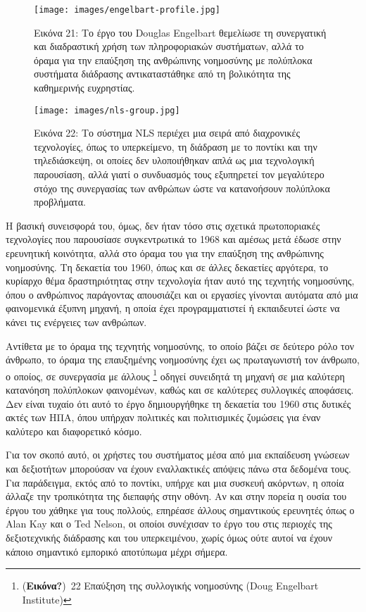 \documentclass[
]{article}
\begin{document}
\leavevmode{}%
\begin{figure}
\hypertarget{fig:engelbart-profile}{%
\centering
\texttt{[image: images/engelbart-profile.jpg]}
\caption{Εικόνα 21: Το έργο του Douglas Engelbart θεμελίωσε τη
συνεργατική και διαδραστική χρήση των πληροφοριακών συστήματων, αλλά το
όραμα για την επαύξηση της ανθρώπινης νοημοσύνης με πολύπλοκα συστήματα
διάδρασης αντικαταστάθηκε από τη βολικότητα της καθημερινής
ευχρηστίας.}\label{fig:engelbart-profile}
}
\end{figure}

\leavevmode{}%
\begin{figure}
\hypertarget{fig:nls-group}{%
\centering
\texttt{[image: images/nls-group.jpg]}
\caption{Εικόνα 22: Το σύστημα NLS περιέχει μια σειρά από διαχρονικές
τεχνολογίες, όπως το υπερκείμενο, τη διάδραση με το ποντίκι και την
τηλεδιάσκεψη, οι οποίες δεν υλοποιήθηκαν απλά ως μια τεχνολογική
παρουσίαση, αλλά γιατί ο συνδυασμός τους εξυπηρετεί τον μεγαλύτερο στόχο
της συνεργασίας των ανθρώπων ώστε να κατανοήσουν πολύπλοκα
προβλήματα.}\label{fig:nls-group}
}
\end{figure}

Η βασική συνεισφορά του, όμως, δεν ήταν τόσο στις σχετικά πρωτοποριακές
τεχνολογίες που παρουσίασε συγκεντρωτικά το 1968 και αμέσως μετά έδωσε
στην ερευνητική κοινότητα, αλλά στο όραμα του για την επαύξηση της
ανθρώπινης νοημοσύνης. Τη δεκαετία του 1960, όπως και σε άλλες δεκαετίες
αργότερα, το κυρίαρχο θέμα δραστηριότητας στην τεχνολογία ήταν αυτό της
τεχνητής νοημοσύνης, όπου ο ανθρώπινος παράγοντας απουσιάζει και οι
εργασίες γίνονται αυτόματα από μια φαινομενικά έξυπνη μηχανή, η οποία
έχει προγραμματιστεί ή εκπαιδευτεί ώστε να κάνει τις ενέργειες των
ανθρώπων.

Αντίθετα με το όραμα της τεχνητής νοημοσύνης, το οποίο βάζει σε δεύτερο
ρόλο τον άνθρωπο, το όραμα της επαυξημένης νοημοσύνης έχει ως
πρωταγωνιστή τον άνθρωπο, ο οποίος, σε συνεργασία με άλλους \footnote{(\textbf{Εικόνα?})~22
  Επαύξηση της συλλογικής νοημοσύνης (Doug Engelbart Institute)} οδηγεί
συνειδητά τη μηχανή σε μια καλύτερη κατανόηση πολύπλοκων φαινομένων,
καθώς και σε καλύτερες συλλογικές αποφάσεις. Δεν είναι τυχαίο ότι αυτό
το έργο δημιουργήθηκε τη δεκαετία του 1960 στις δυτικές ακτές των ΗΠΑ,
όπου υπήρχαν πολιτικές και πολιτισμικές ζυμώσεις για έναν καλύτερο και
διαφορετικό κόσμο.

Για τον σκοπό αυτό, οι χρήστες του συστήματος μέσα από μια εκπαίδευση
γνώσεων και δεξιοτήτων μπορούσαν να έχουν εναλλακτικές απόψεις πάνω στα
δεδομένα τους. Για παράδειγμα, εκτός από το ποντίκι, υπήρχε και μια
συσκευή ακόρντων, η οποία άλλαζε την τροπικότητα της διεπαφής στην
οθόνη. Αν και στην πορεία η ουσία του έργου του χάθηκε για τους πολλούς,
επηρέασε άλλους σημαντικούς ερευνητές όπως ο Alan Kay και ο Ted Nelson,
οι οποίοι συνέχισαν το έργο του στις περιοχές της δεξιοτεχνικής
διάδρασης και του υπερκειμένου, χωρίς όμως ούτε αυτοί να έχουν κάποιο
σημαντικό εμπορικό αποτύπωμα μέχρι σήμερα.
\end{document}
